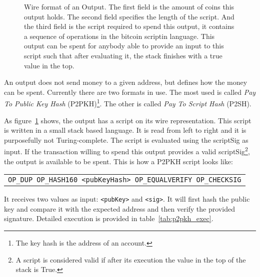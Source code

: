 \begin{figure}[ht]
  \centering
  
  \caption[Wire format of an Output]{Wire format of an Output.
           The first field is the amount of coins this output holds.
           The second field specifies the length of the script.
           And the third field is the script required to spend this output,
             it contains a sequence of operations in the bitcoin scriptin
             language.
           This output can be spent for anybody able to provide an input to this
             script such that after evaluating it, the stack finishes with a
             true value in the top.
             }
  \label{fig:output}
\end{figure}

An output does not send money to a given address, but defines how the money can
  be spent. Currently there are two formats in use. The most used is called
  \textit{Pay To Public Key Hash} (P2PKH)\footnote{The key hash is the address of an
  account.}. The other is called \textit{Pay To Script Hash} (P2SH).

As figure~\ref{fig:output} shows, the output has a script on its wire
  representation.
This script is written in a small stack based language.
It is read from left to right and it is purposefully not Turing-complete.
The script is evaluated using the scriptSig as input. If the transaction willing
  to spend this output provides a valid scriptSig\footnote{A script is
  considered valid if after its execution the value in the top of the stack is
  True.}, the output is available to be spent. This is how a P2PKH script looks
  like:

\begin{center}
  \begin{tabular}{|c|}
    \texttt{OP\_DUP OP\_HASH160 <pubKeyHash> OP\_EQUALVERIFY OP\_CHECKSIG}
  \end{tabular}
\end{center}

It receives two values as input:  \lstinline{<pubKey>} and \lstinline{<sig>}.
It will first hash the public key and compare it with the expected address and
  then verify the provided signature.
Detailed execution is provided in table~\ref{tab:p2pkh_exec}.

